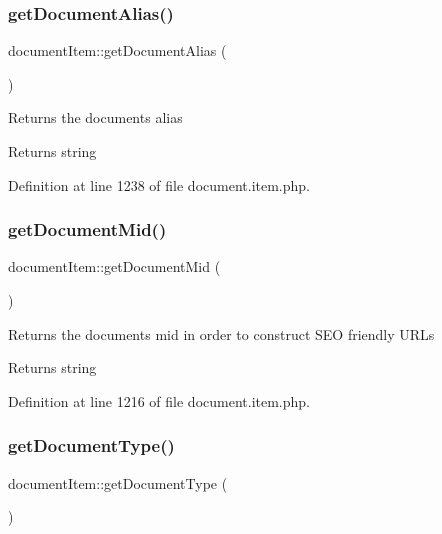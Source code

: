 \subsubsection{\texorpdfstring{get\+Document\+Alias()}{getDocumentAlias()}}
{\footnotesize\ttfamily document\+Item\+::get\+Document\+Alias (\begin{DoxyParamCaption}{ }\end{DoxyParamCaption})}

Returns the document\textquotesingle{}s alias \begin{DoxyReturn}{Returns}
string 
\end{DoxyReturn}


Definition at line 1238 of file document.\+item.\+php.

\mbox{\label{classdocumentItem_ae8d90b15c65199e9acb4622b3da43119}} 
\subsubsection{\texorpdfstring{get\+Document\+Mid()}{getDocumentMid()}}
{\footnotesize\ttfamily document\+Item\+::get\+Document\+Mid (\begin{DoxyParamCaption}{ }\end{DoxyParamCaption})}

Returns the document\textquotesingle{}s mid in order to construct S\+EO friendly U\+R\+Ls \begin{DoxyReturn}{Returns}
string 
\end{DoxyReturn}


Definition at line 1216 of file document.\+item.\+php.

\mbox{\label{classdocumentItem_a393ee98eeada92d1bd3b41f5018f746e}} 
\subsubsection{\texorpdfstring{get\+Document\+Type()}{getDocumentType()}}
{\footnotesize\ttfamily document\+Item\+::get\+Document\+Type (\begin{DoxyParamCaption}{ }\end{DoxyParamCaption})}

